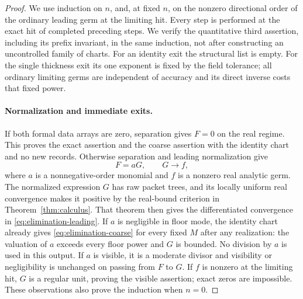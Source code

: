 \begin{proof}
We use induction on $n$, and, at fixed $n$, on the nonzero directional
order of the ordinary leading germ at the limiting hit.  Every step is
performed at the exact hit of completed preceding steps.  We verify
the quantitative third assertion, including its prefix invariant,
in the same induction, not after constructing an uncontrolled family
of charts.  For an identity exit the structural list is empty.
For the single thickness exit its one exponent is fixed by the
field tolerance; all ordinary limiting germs are independent of
accuracy and its direct inverse costs that fixed power.

\paragraph{Normalization and immediate exits.}
If both formal data arrays are zero, separation gives $F=0$ on the
real regime.  This proves the exact assertion and the coarse assertion
with the identity chart and no new records.  Otherwise separation
and leading normalization give
\begin{equation}\label{eq:elimination-leading}
 F=aG,\qquad G\longrightarrow f,
\end{equation}
where $a$ is a nonnegative-order monomial and $f$ is a nonzero real
analytic germ.  The normalized expression $G$ has raw packet trees,
and its locally uniform real convergence makes it positive by the
real-bound criterion in Theorem~\ref{thm:calculus}.  That theorem then
gives the differentiated convergence in
\eqref{eq:elimination-leading}.  If $a$ is negligible in floor mode,
the identity chart already gives \eqref{eq:elimination-coarse} for
every fixed $M$ after any realization: the valuation of $a$ exceeds
every floor power and $G$ is bounded.  No division by $a$ is used in
this output.  If $a$ is visible, it is a moderate divisor and
visibility or negligibility is unchanged on passing from $F$ to $G$.
If $f$ is nonzero at the limiting hit, $G$ is a regular unit, proving
the visible assertion; exact zeros are impossible.  These observations
also prove the induction when $n=0$.


\end{proof}

